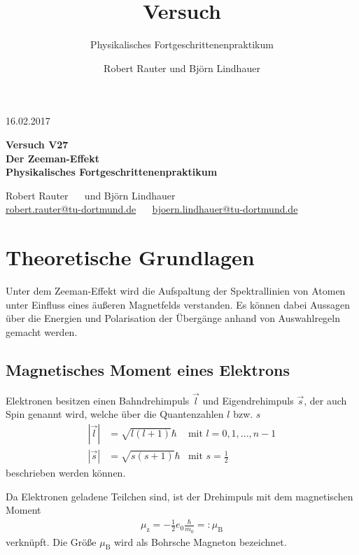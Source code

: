 \documentclass[captions=tableheading]{scrartcl}
\title{Versuch \versuchnummer\\ \versuchname}
\subtitle{Physikalisches Fortgeschrittenenpraktikum}
\author{Robert Rauter und Björn Lindhauer}
\date{\versuchdatum}
\newcommand{\versuchnummer}{V27}
\newcommand{\versuchname}{Der Zeeman-Effekt}
\newcommand{\versuchdatum}{16.02.2017}
\newcommand{\indx}[1]{\text{#1}}
\begin{document}
\begin{titlepage}
{\large \versuchdatum}
\vspace{7cm}
\begin{center}
\textbf{\huge Versuch \versuchnummer}\\\vspace{0.5cm}
\textbf{\huge \versuchname}\\
\vspace{0.2cm}
\textbf{Physikalisches Fortgeschrittenenpraktikum}\\
\vspace{9cm}

{\Large Robert Rauter \ \ \hspace{1.5cm} und \hspace{1.5cm} Björn Lindhauer}\\
{ \url{robert.rauter@tu-dortmund.de} \ \ \hspace{2cm} \url{bjoern.lindhauer@tu-dortmund.de}}
\end{center}
\end{titlepage}

\section{Theoretische Grundlagen}
Unter dem Zeeman-Effekt wird die Aufspaltung der Spektrallinien von Atomen unter Einfluss eines äußeren Magnetfelds verstanden. 
Es können dabei Aussagen über die Energien und Polarisation der Übergänge anhand von Auswahlregeln gemacht werden.

\subsection{Magnetisches Moment eines Elektrons}
Elektronen besitzen einen Bahndrehimpuls $\vec{l}$ und Eigendrehimpuls $\vec{s}$, der auch Spin genannt wird, welche über die Quantenzahlen $l$ bzw. $s$
\begin{align}
\left| \vec{l} \right| &= \sqrt{l\left(l+1\right)}\hbar &  \text{mit } l=0,1,...,n-1\\
\left| \vec{s} \right| &= \sqrt{s\left(s+1\right)}\hbar &  \text{mit }  s=\frac{1}{2}
\end{align}
beschrieben werden können.

Da Elektronen geladene Teilchen sind, ist der Drehimpuls mit dem magnetischen Moment 
\begin{align}
\mu_\indx{z}=-\frac{1}{2}e_\indx{0} \frac{\hbar}{m_0}=:\mu_\indx{B}
\end{align}
verknüpft. 
Die Größe $\mu_\indx{B}$ wird als Bohrsche Magneton bezeichnet.
\end{document}
